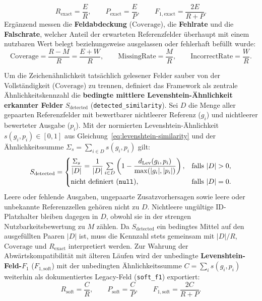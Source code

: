 \begin{equation}
  R_{\mathrm{exact}} = \frac{E}{R}, \qquad
  P_{\mathrm{exact}} = \frac{E}{P}, \qquad
  F_{1,\mathrm{exact}} = \frac{2E}{R + P}.
  \label{eq:exact-prf}
\end{equation}
Ergänzend messen die \textbf{Feldabdeckung} ($\mathrm{Coverage}$), die \textbf{Fehlrate} und die \textbf{Falschrate}, welcher Anteil der erwarteten Referenzfelder überhaupt mit einem nutzbaren Wert belegt beziehungsweise ausgelassen oder fehlerhaft befüllt wurde:
\begin{equation}
  \mathrm{Coverage} = \frac{R - M}{R} = \frac{E + W}{R}, \qquad
  \mathrm{MissingRate} = \frac{M}{R}, \qquad
  \mathrm{IncorrectRate} = \frac{W}{R}.
  \label{eq:coverage-rates}
\end{equation}

Um die Zeichenähnlichkeit tatsächlich gelesener Felder sauber von der Vollständigkeit ($\mathrm{Coverage}$) zu trennen, definiert das Framework als zentrale Ähnlichkeitskennzahl die \textbf{bedingte mittlere Levenshtein-Ähnlichkeit erkannter Felder} $S_{\mathrm{detected}}$ (\texttt{detected\_similarity}). Sei $D$ die Menge aller gepaarten Referenzfelder mit bewertbarer nichtleerer Referenz ($g_i$) und nichtleerer bewerteter Ausgabe ($p_i$). Mit der normierten Levenshtein-Ähnlichkeit $s(g_i, p_i) \in [0, 1]$ aus Gleichung~\eqref{eq:levenshtein-similarity} und der Ähnlichkeitssumme $\Sigma_s = \sum_{i \in D} s(g_i, p_i)$ gilt:
\begin{equation}
  S_{\mathrm{detected}} = \begin{cases}
    \dfrac{\Sigma_s}{|D|} = \dfrac{1}{|D|} \sum\limits_{i \in D} \left( 1 - \dfrac{d_{\mathrm{Lev}}(g_i, p_i)}{\max(|g_i|, |p_i|)} \right), & \text{falls } |D| > 0, \\[8pt]
    \text{nicht definiert (\texttt{null})}, & \text{falls } |D| = 0.
  \end{cases}
  \label{eq:detected-similarity}
\end{equation}
Leere oder fehlende Ausgaben, ungepaarte Zusatzvorhersagen sowie leere oder unbekannte Referenzzellen gehören nicht zu $D$. Nichtleere ung\"ultige ID-Platzhalter bleiben dagegen in $D$, obwohl sie in der strengen Nutzbarkeitsbewertung zu $M$ z\"ahlen. Da $S_{\mathrm{detected}}$ ein bedingtes Mittel auf den ausgefüllten Paaren $|D|$ ist, muss die Kennzahl stets gemeinsam mit $|D|/R$, $\mathrm{Coverage}$ und $R_{\mathrm{exact}}$ interpretiert werden. Zur Wahrung der Abwärtskompatibilität mit älteren Läufen wird der unbedingte \textbf{Levenshtein-Feld-$F_1$} ($F_{1,\mathrm{soft}}$) mit der unbedingten Ähnlichkeitssumme $C = \sum_{i} s(g_i, p_i)$ weiterhin als dokumentiertes Legacy-Feld (\texttt{soft\_f1}) exportiert:
\begin{equation}
  R_{\mathrm{soft}} = \frac{C}{R}, \qquad
  P_{\mathrm{soft}} = \frac{C}{P}, \qquad
  F_{1,\mathrm{soft}} = \frac{2C}{R + P}.
  \label{eq:soft-f1-legacy}
\end{equation}

